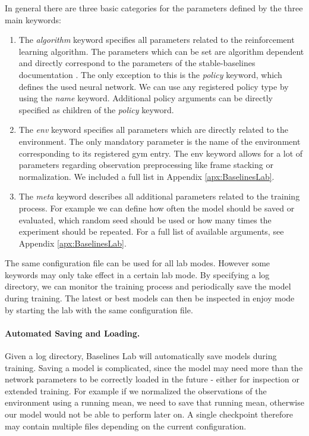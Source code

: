 In general there are three basic categories for the parameters defined by the three main keywords: 

\begin{enumerate}
    \item The \textit{algorithm} keyword specifies all parameters related to the reinforcement learning algorithm. The parameters which can be set are algorithm dependent and directly correspond to the parameters of the stable-baselines documentation \cite{stable-baselines-docs}. The only exception to this is the \textit{policy} keyword, which defines the used neural network. We can use any registered policy type by using the \textit{name} keyword. Additional policy arguments can be directly specified as children of the \textit{policy} keyword.
    \item The \textit{env} keyword specifies all parameters which are directly related to the environment. The only mandatory parameter is the name of the environment corresponding to its registered gym entry. The env keyword allows for a lot of parameters regarding observation preprocessing like frame stacking or normalization. We included a full list in Appendix \ref{apx:BaselinesLab}. 
    \item  The \textit{meta} keyword describes all additional parameters related to the training process. For example we can define how often the model should be saved or evaluated, which random seed should be used or how many times the experiment should be repeated. For a full list of available arguments, see Appendix \ref{apx:BaselinesLab}.
\end{enumerate}

The same configuration file can be used for all lab modes. However some keywords may only take effect in a certain lab mode. By specifying a log directory, we can monitor the training process and periodically save the model during training. The latest or best models can then be inspected in enjoy mode by starting the lab with the same configuration file. 

\paragraph{Automated Saving and Loading.}
Given a log directory, Baselines Lab will automatically save models during training. Saving a model is complicated, since the model may need more than the network parameters to be correctly loaded in the future - either for inspection or extended training. For example if we normalized the observations of the environment using a running mean, we need to save that running mean, otherwise our model would not be able to perform later on. A single checkpoint therefore may contain multiple files depending on the current configuration.

